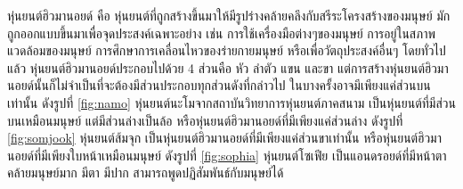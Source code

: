 หุ่นยนต์ฮิวมานอยด์ คือ หุ่นยนต์ที่ถูกสร้างขึ้นมาให้มีรูปร่างคล้ายคลึงกับสรีระโครงสร้างของมนุษย์
มักถูกออกแบบขึ้นมาเพื่อจุดประสงค์เฉพาะอย่าง เช่น การใช้เครื่องมือต่างๆของมนุษย์ การอยู่ในสภาพแวดล้อมของมนุษย์
การศึกษาการเคลื่อนไหวของร่ายกายมนุษย์ หรือเพื่อวัตถุประสงค์อื่นๆ โดยทั่วไปแล้ว หุ่นยนต์ฮิวมานอยด์ประกอบไปด้วย 4 ส่วนคือ หัว ลำตัว แขน
และขา แต่การสร้างหุ่นยนต์ฮิวมานอยด์นั้นก็ไม่จำเป็นที่จะต้องมีส่วนประกอบทุกส่วนดังที่กล่าวไป
ในบางครั้งอาจมีเพียงแค่ส่วนบนเท่านั้น ดังรูปที่ \ref{fig:namo} หุ่นยนต์นะโมจากสถาบันวิทยาการหุ่นยนต์ภาคสนาม
เป็นหุ่นยนต์ที่มีส่วนบนเหมือนมนุษย์ แต่มีส่วนล่างเป็นล้อ หรือหุ่นยนต์ฮิวมานอยด์ที่มีเพียงแค่ส่วนล่าง ดังรูปที่ \ref{fig:somjook}
หุ่นยนต์ส้มจุก เป็นหุ่นยนต์ฮิวมานอยด์ที่มีเพียงแค่ส่วนขาเท่านั้น หรือหุ่นยนต์ฮิวมานอยด์ที่มีเพียงใบหน้าเหมือนมนุษย์ ดังรูปที่
\ref{fig:sophia} หุ่นยนต์โซเฟีย เป็นแอนดรอยด์ที่มีหน้าตาคล้ายมนุษย์มาก มีตา มีปาก สามารถพูดปฏิสัมพันธ์กับมนุษย์ได้

